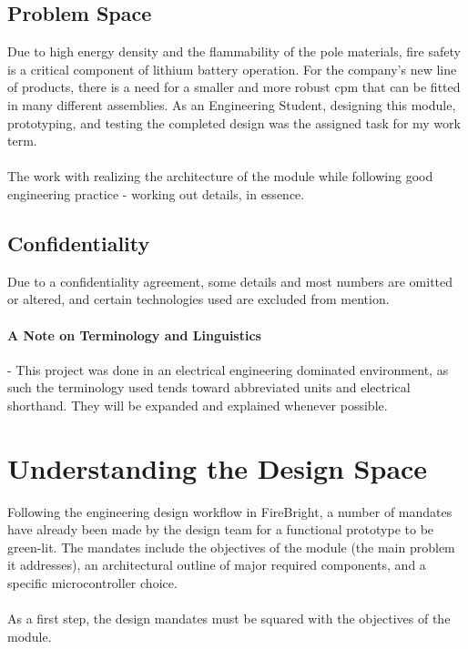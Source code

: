 \documentclass[12pt]{article}
\begin{document}
	\subsection{Problem Space}
	Due to high energy density and the flammability of the pole materials, fire safety is a critical component of lithium battery operation. For the company's new line of products, there is a need for a smaller and more robust \acrfull{cpm} that can be fitted in many different assemblies. As an Engineering Student, designing this module, prototyping, and testing the completed design was the assigned task for my work term.
	
    \paragraph{}
	The work with realizing the architecture of the module while following good engineering practice - working out details, in essence.

  \subsection{Confidentiality}
  Due to a confidentiality agreement, some details and most numbers are omitted or altered, and certain technologies used are excluded from mention.


  \paragraph{A Note on Terminology and Linguistics} - This project was done in an electrical engineering dominated environment, as such the terminology used tends toward abbreviated units and electrical shorthand. They will be expanded and explained whenever possible.
  
  \section{Understanding the Design Space}
  Following the engineering design workflow in FireBright, a number of mandates have already been made by the design team for a functional prototype to be green-lit. The mandates include the objectives of the module (the main problem it addresses), an architectural outline of major required components, and a specific microcontroller choice.

  \paragraph{}
  As a first step, the design mandates must be squared with the objectives of the module. 
\end{document}
